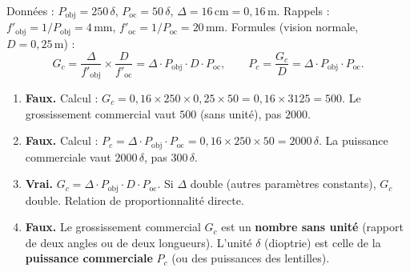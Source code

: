 \documentclass[11pt]{article}
\begin{document}
\begin{corrige}
Données : $P_{\text{obj}} = 250\,\delta$, $P_{\text{oc}} = 50\,\delta$, $\Delta = 16\,\text{cm} = 0,16\,\text{m}$.
Rappels : $f'_{\text{obj}} = 1/P_{\text{obj}} = 4\,\text{mm}$, $f'_{\text{oc}} = 1/P_{\text{oc}} = 20\,\text{mm}$.
Formules (vision normale, $D = 0,25\,\text{m}$) :
\[
G_c = \frac{\Delta}{f'_{\text{obj}}} \times \frac{D}{f'_{\text{oc}}} = \Delta \cdot P_{\text{obj}} \cdot D \cdot P_{\text{oc}}, \qquad
P_c = \frac{G_c}{D} = \Delta \cdot P_{\text{obj}} \cdot P_{\text{oc}}.
\]

\begin{enumerate}
    \item \textbf{Faux.}
    Calcul : $G_c = 0,16 \times 250 \times 0,25 \times 50 = 0,16 \times 3125 = 500$.
    Le grossissement commercial vaut $500$ (sans unité), pas $2000$.
    \item \textbf{Faux.}
    Calcul : $P_c = \Delta \cdot P_{\text{obj}} \cdot P_{\text{oc}} = 0,16 \times 250 \times 50 = 2000\,\delta$.
    La puissance commerciale vaut $2000\,\delta$, pas $300\,\delta$.
    \item \textbf{Vrai.}
    $G_c = \Delta \cdot P_{\text{obj}} \cdot D \cdot P_{\text{oc}}$. Si $\Delta$ double (autres paramètres constants), $G_c$ double. Relation de proportionnalité directe.
    \item \textbf{Faux.}
    Le grossissement commercial $G_c$ est un \textbf{nombre sans unité} (rapport de deux angles ou de deux longueurs). L'unité $\delta$ (dioptrie) est celle de la \textbf{puissance commerciale} $P_c$ (ou des puissances des lentilles).
\end{enumerate}
\end{corrige}
\end{document}
